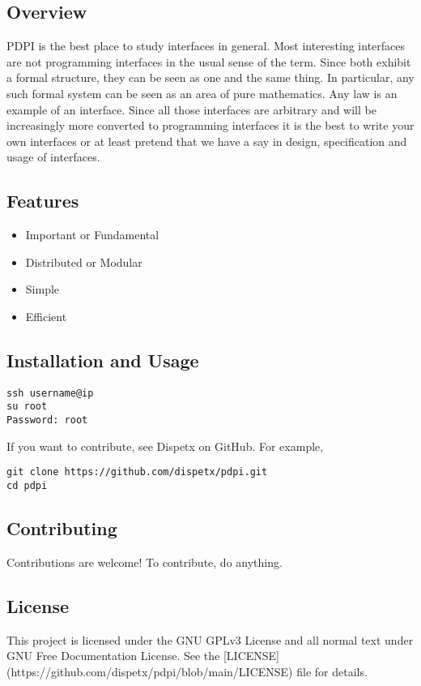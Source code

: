 \documentclass{article}
\begin{document}
\subsection*{Overview}
PDPI is the best place to study interfaces in general. Most interesting
interfaces are not programming interfaces in the usual sense of the term.
Since both exhibit a formal structure, they can be seen as one and the
same thing. In particular, any such formal system can be seen as an area
of pure mathematics. Any law is an example of an
interface. Since all those interfaces are arbitrary and will be increasingly
more converted to programming interfaces it is the best to write your own
interfaces or at least pretend that we have a say in design, specification
and usage of interfaces.

\subsection*{Features}
\begin{itemize}
    \item Important or Fundamental
    \item Distributed or Modular
    \item Simple
    \item Efficient
\end{itemize}

\subsection*{Installation and Usage}
\begin{lstlisting}
ssh username@ip
su root
Password: root
\end{lstlisting}

If you want to contribute, see Dispetx on GitHub.
For example,

\begin{lstlisting}
git clone https://github.com/dispetx/pdpi.git
cd pdpi
\end{lstlisting}


\subsection*{Contributing}
Contributions are welcome! To contribute, do anything.

\subsection*{License}
This project is licensed under the GNU GPLv3 License and all normal text under GNU Free Documentation License.
See the [LICENSE](https://github.com/dispetx/pdpi/blob/main/LICENSE) file for details.
\end{document}
